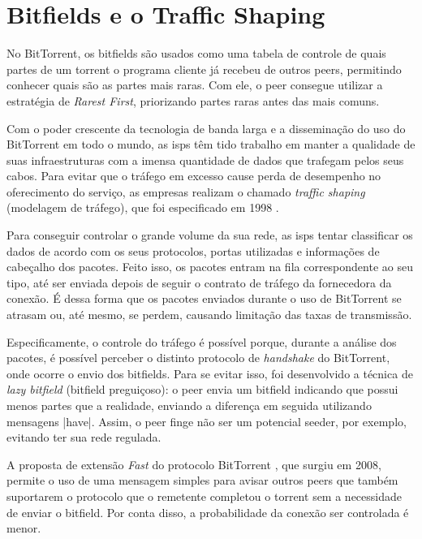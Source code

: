 
\newpage
\section{Bitfields e o Traffic Shaping}
\label{sec:bitfield}

No BitTorrent, os bitfields são usados como uma tabela de controle de quais partes de um
\gls*{torrent} o programa cliente já recebeu de outros \glspl*{peer}, permitindo
conhecer quais são as partes mais raras. Com ele, o \gls*{peer} consegue utilizar a
estratégia de \emph{Rarest First}, priorizando partes raras antes das mais comuns.

Com o poder crescente da tecnologia de banda larga e a disseminação do uso do
BitTorrent em todo o mundo, as \glspl{isp} têm tido trabalho em manter a qualidade de
suas infraestruturas com a imensa quantidade de dados que trafegam pelos seus cabos.
Para evitar que o tráfego em excesso cause perda de desempenho no oferecimento do
serviço, as empresas realizam o chamado \emph{traffic shaping} (modelagem de tráfego),
que foi especificado em 1998 \cite{site:rfcshaping}.

Para conseguir controlar o grande volume da sua rede, as \glspl*{isp} tentar
classificar os dados de acordo com os seus protocolos, portas utilizadas e informações
de cabeçalho dos pacotes. Feito isso, os pacotes entram na fila correspondente ao seu
tipo, até ser enviada depois de seguir o contrato de tráfego da fornecedora da conexão.
É dessa forma que os pacotes enviados durante o uso de BitTorrent se atrasam ou, até
mesmo, se perdem, causando limitação das taxas de transmissão.

Especificamente, o controle do tráfego é possível porque, durante a análise dos
pacotes, é possível perceber o distinto protocolo de \emph{handshake} do BitTorrent,
onde ocorre o envio dos bitfields. Para se evitar isso, foi desenvolvido a técnica de
\emph{lazy bitfield} (bitfield preguiçoso): o \gls*{peer} envia um bitfield indicando
que possui menos partes que a realidade, enviando a diferença em seguida utilizando
mensagens \bverb|have|. Assim, o \gls*{peer} finge não ser um potencial \gls{seeder},
por exemplo, evitando ter sua rede regulada.

A proposta de extensão \emph{Fast} do protocolo BitTorrent \cite{site:bittorrent-fast},
que surgiu em 2008, permite o uso de uma mensagem simples para avisar outros
\glspl*{peer} que também suportarem o protocolo que o remetente completou o
\gls*{torrent} sem a necessidade de enviar o bitfield. Por conta disso, a probabilidade
da conexão ser controlada é menor.